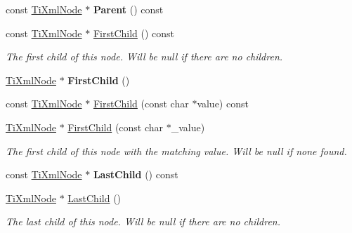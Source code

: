 \begin{DoxyCompactItemize}
const \hyperlink{class_ti_xml_node}{Ti\+Xml\+Node} $\ast$ {\bfseries Parent} () const
\item 
\mbox{\label{class_ti_xml_node_aa66bceae19707c90c1db12d7c98894a4}} 
const \hyperlink{class_ti_xml_node}{Ti\+Xml\+Node} $\ast$ \hyperlink{class_ti_xml_node_aa66bceae19707c90c1db12d7c98894a4}{First\+Child} () const
\begin{DoxyCompactList}\small\item\em The first child of this node. Will be null if there are no children. \end{DoxyCompactList}\item 
\mbox{\label{class_ti_xml_node_a5e97d69b7c0ebd27fb7286be56559b77}} 
\hyperlink{class_ti_xml_node}{Ti\+Xml\+Node} $\ast$ {\bfseries First\+Child} ()
\item 
const \hyperlink{class_ti_xml_node}{Ti\+Xml\+Node} $\ast$ \hyperlink{class_ti_xml_node_ae98c367f664890c4b5a5183481ec128a}{First\+Child} (const char $\ast$value) const
\item 
\mbox{\label{class_ti_xml_node_abc8bf32be6419ec453a731868de19554}} 
\hyperlink{class_ti_xml_node}{Ti\+Xml\+Node} $\ast$ \hyperlink{class_ti_xml_node_abc8bf32be6419ec453a731868de19554}{First\+Child} (const char $\ast$\+\_\+value)
\begin{DoxyCompactList}\small\item\em The first child of this node with the matching \textquotesingle{}value\textquotesingle{}. Will be null if none found. \end{DoxyCompactList}\item 
\mbox{\label{class_ti_xml_node_af3a04120b1ed2fead2f4bb72cbea845e}} 
const \hyperlink{class_ti_xml_node}{Ti\+Xml\+Node} $\ast$ {\bfseries Last\+Child} () const
\item 
\mbox{\label{class_ti_xml_node_a6432d2b2495f6caf9cb4278df706a031}} 
\hyperlink{class_ti_xml_node}{Ti\+Xml\+Node} $\ast$ \hyperlink{class_ti_xml_node_a6432d2b2495f6caf9cb4278df706a031}{Last\+Child} ()
\begin{DoxyCompactList}\small\item\em The last child of this node. Will be null if there are no children. \end{DoxyCompactList}\item 

\end{DoxyCompactItemize}
